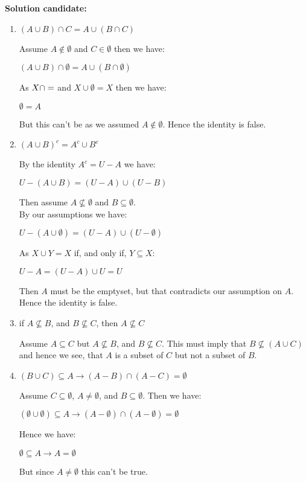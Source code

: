\documentclass{report}
\newcommand{\cent}[1]{\begin{center}#1\end{center}}
\newcommand{\In}{\! \in \!}
\newcommand{\solution}{\textbf{Solution candidate: }}
\begin{document}
	\solution
	\begin{enumerate}
		\item $ (A \cup B) \cap C = A \cup (B \cap C) $
		
		Assume $A \notin \emptyset$ and $C \In \emptyset$ then we have:
		
		\cent{$ (A \cup B) \cap \emptyset = A \cup (B \cap \emptyset) $}
		
		As $X \cap \empty = \empty$ and $X \cup \emptyset = X$ then we have:
		
		\cent{$ \emptyset = A $}
		
		But this can't be as we assumed $A \notin \emptyset$. Hence the identity is false.
		
		\item $(A \cup B)^c = A^c \cup B^c$
		
		By the identity $ A^c = U-A $ we have:
		
		\cent{$U - (A \cup B) = (U-A) \cup (U-B)$}
		
		Then assume $A \not \subseteq \emptyset$ and $B \subseteq \emptyset$.\\
		
		By our assumptions we have:
		
		\cent{$ U - (A \cup \emptyset) = (U-A) \cup (U-\emptyset) $}
		
		As $X \cup Y = X$ if, and only if, $Y \subseteq X$:
		
		\cent{$ U - A = (U-A) \cup U = U $}
		
		Then $A$ must be the emptyset, but that contradicts our assumption on $A$. Hence the identity is false.
		
		\item if $ A \not \subseteq B $, and $ B \not \subseteq C $, then $ A \not \subseteq C $
		
		Assume $A \subseteq C$ but $A \not \subseteq B$, and $B \not \subseteq C$. This must imply that $B \not \subseteq (A \cup C)$ and hence we see, that $A$ is a subset of $C$ but not a subset of $B$.
		
		\item $ (B \cup C) \subseteq A \to (A-B) \cap (A-C) = \emptyset $
		
		Assume $C \subseteq \emptyset$, $A \neq \emptyset$, and $B \subseteq \emptyset$. Then we have:
		
		\cent{$ (\emptyset \cup \emptyset) \subseteq A \to (A-\emptyset) \cap (A-\emptyset) = \emptyset $}
		
		Hence we have:
		
		\cent{$ \emptyset \subseteq A \to A = \emptyset $}
		
		But since $A \neq \emptyset$ this can't be true.
		
 	\end{enumerate}
 	
\end{document}
